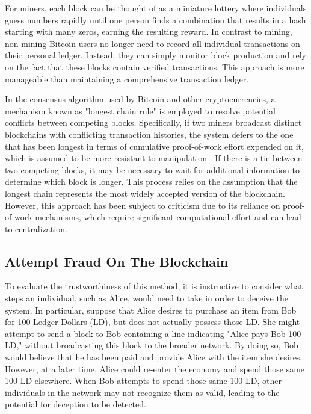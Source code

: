 For miners, each block can be thought of as a miniature lottery where individuals guess numbers rapidly until one person finds a combination that results in a hash starting with many zeros, earning the resulting reward. In contrast to mining, non-mining Bitcoin users no longer need to record all individual transactions on their personal ledger. Instead, they can simply monitor block production and rely on the fact that these blocks contain verified transactions. This approach is more manageable than maintaining a comprehensive transaction ledger.

In the consensus algorithm used by Bitcoin and other cryptocurrencies, a mechanism known as "longest chain rule" is employed to resolve potential conflicts between competing blocks. Specifically, if two miners broadcast distinct blockchains with conflicting transaction histories, the system defers to the one that has been longest in terms of cumulative proof-of-work effort expended on it, which is assumed to be more resistant to manipulation \cite{buterin2014next}. If there is a tie between two competing blocks, it may be necessary to wait for additional information to determine which block is longer. This process relies on the assumption that the longest chain represents the most widely accepted version of the blockchain. However, this approach has been subject to criticism due to its reliance on proof-of-work mechanisms, which require significant computational effort and can lead to centralization.

\subsection{Attempt Fraud On The Blockchain}
To evaluate the trustworthiness of this method, it is instructive to consider what steps an individual, such as Alice, would need to take in order to deceive the system. In particular, suppose that Alice desires to purchase an item from Bob for 100 Ledger Dollars (LD), but does not actually possess those LD. She might attempt to send a block to Bob containing a line indicating "Alice pays Bob 100 LD," without broadcasting this block to the broader network. By doing so, Bob would believe that he has been paid and provide Alice with the item she desires. However, at a later time, Alice could re-enter the economy and spend those same 100 LD elsewhere. When Bob attempts to spend those same 100 LD, other individuals in the network may not recognize them as valid, leading to the potential for deception to be detected.

